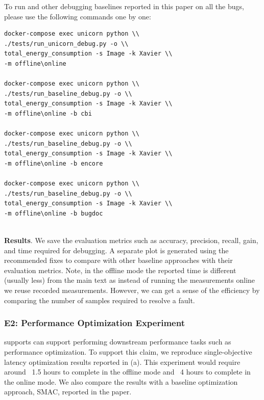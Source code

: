 To run \ourtool and other debugging baselines reported in this paper on all the bugs, please use the following commands one by one:
\begin{verbatim}
docker-compose exec unicorn python \\ 
./tests/run_unicorn_debug.py -o \\
total_energy_consumption -s Image -k Xavier \\
-m offline\online 
    
docker-compose exec unicorn python \\ 
./tests/run_baseline_debug.py -o \\
total_energy_consumption -s Image -k Xavier \\
-m offline\online -b cbi 
    
docker-compose exec unicorn python \\ 
./tests/run_baseline_debug.py -o \\
total_energy_consumption -s Image -k Xavier \\
-m offline\online -b encore
    
docker-compose exec unicorn python \\ 
./tests/run_baseline_debug.py -o \\
total_energy_consumption -s Image -k Xavier \\
-m offline\online -b bugdoc
    
\end{verbatim}

\noindent \textbf{Results}. We save the evaluation metrics such as accuracy, precision, recall, gain, and time required for debugging. A separate plot is generated using the recommended fixes to compare \ourapproach with other baseline approaches with their evaluation metrics. Note, in the offline mode the reported time is different (usually less) from the main text as instead of running the measurements online we reuse recorded measurements. However, we can get a sense of the efficiency by comparing the number of samples required to resolve a fault.

\subsubsection{E2: Performance Optimization Experiment} \ourapproach supports can support performing downstream performance tasks such as performance optimization. To support this claim, we reproduce single-objective latency optimization results reported in  (a). This experiment would require around ~1.5 hours to complete in the offline mode and ~4 hours to complete in the online mode. We also compare the results with a baseline optimization approach, \textsc{SMAC}, reported in the paper. 


